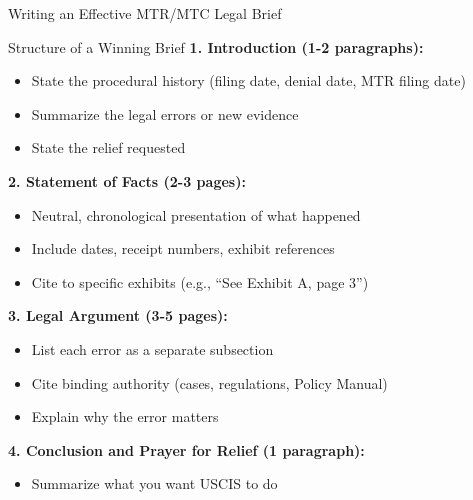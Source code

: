 \documentclass[11pt]{beamer}
\begin{document}
	\begin{frame}{Writing an Effective MTR/MTC Legal Brief}
		\scriptsize
		\begin{block}{Structure of a Winning Brief}
			\textbf{1. Introduction (1-2 paragraphs):}
			\begin{itemize}
				\item State the procedural history (filing date, denial date, MTR filing date)
				\item Summarize the legal errors or new evidence
				\item State the relief requested
			\end{itemize}
			\textbf{2. Statement of Facts (2-3 pages):}
			\begin{itemize}
				\item Neutral, chronological presentation of what happened
				\item Include dates, receipt numbers, exhibit references
				\item Cite to specific exhibits (e.g., ``See Exhibit A, page 3'')
			\end{itemize}
			\textbf{3. Legal Argument (3-5 pages):}
			\begin{itemize}
				\item List each error as a separate subsection
				\item Cite binding authority (cases, regulations, Policy Manual)
				\item Explain why the error matters
			\end{itemize}
			\textbf{4. Conclusion and Prayer for Relief (1 paragraph):}
			\begin{itemize}
				\item Summarize what you want USCIS to do
			\end{itemize}
		\end{block}
	\end{frame}
	
\end{document}
